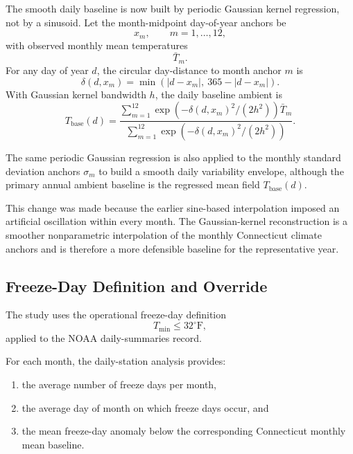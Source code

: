 \documentclass{article}
\begin{document}
The smooth daily baseline is now built by periodic Gaussian kernel
regression, not by a sinusoid. Let the month-midpoint day-of-year anchors be
\begin{equation}
x_m,
\qquad m=1,\dots,12,
\end{equation}
with observed monthly mean temperatures
\begin{equation}
\bar{T}_m.
\end{equation}
For any day of year $d$, the circular day-distance to month anchor $m$ is
\begin{equation}
\delta(d,x_m)
=
\min\!\left(|d-x_m|,\ 365-|d-x_m|\right).
\end{equation}
With Gaussian kernel bandwidth $h$, the daily baseline ambient is
\begin{equation}
T_{\mathrm{base}}(d)
=
\frac{
\sum_{m=1}^{12}
\exp\!\left(-\delta(d,x_m)^2/(2h^2)\right)\bar{T}_m
}{
\sum_{m=1}^{12}
\exp\!\left(-\delta(d,x_m)^2/(2h^2)\right)
}.
\end{equation}

The same periodic Gaussian regression is also applied to the monthly standard
deviation anchors $\sigma_m$ to build a smooth daily variability envelope,
although the primary annual ambient baseline is the regressed mean field
$T_{\mathrm{base}}(d)$.

This change was made because the earlier sine-based interpolation imposed an
artificial oscillation within every month. The Gaussian-kernel reconstruction
is a smoother nonparametric interpolation of the monthly Connecticut climate
anchors and is therefore a more defensible baseline for the representative
year.

\subsection{Freeze-Day Definition and Override}

The study uses the operational freeze-day definition
\begin{equation}
T_{\min} \le 32^\circ\mathrm{F},
\end{equation}
applied to the NOAA daily-summaries record.

For each month, the daily-station analysis provides:
\begin{enumerate}
\item the average number of freeze days per month,
\item the average day of month on which freeze days occur, and
\item the mean freeze-day anomaly below the corresponding Connecticut monthly
mean baseline.
\end{enumerate}
\end{document}
